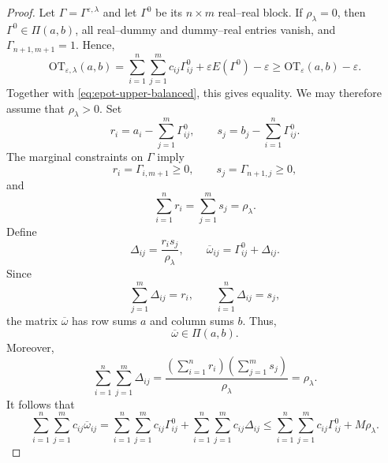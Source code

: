 \documentclass[10pt,a4paper]{amsart}
\newcommand{\OT}{\mathrm{OT}}
\newcommand{\eps}{\varepsilon}
\begin{document}
\begin{proof}
Let $\Gamma=\Gamma^{\eps,\lambda}$ and let $\Gamma^0$ be its $n\times m$ real--real block. If $\rho_{\lambda}=0$, then $\Gamma^0\in\Pi(a,b)$, all real--dummy and dummy--real entries vanish, and $\Gamma_{n+1,m+1}=1$. Hence,
\begin{equation*}
  \OT_{\eps,\lambda}(a,b) = \sum_{i = 1}^{n}\sum_{j = 1}^{m}c_{ij}\Gamma^0_{ij} + \eps E(\Gamma^0)-\eps \geq \OT_{\eps}(a,b)-\eps.
\end{equation*}
Together with \eqref{eq:epot-upper-balanced}, this gives equality. We may therefore assume that $\rho_{\lambda}>0$.
Set
\begin{equation*}
  r_i=a_i-\sum_{j=1}^{m}\Gamma^0_{ij},\qquad s_j=b_j-\sum_{i=1}^{n}\Gamma^0_{ij}.
\end{equation*}
The marginal constraints on $\Gamma$ imply
\begin{equation*}
  r_i=\Gamma_{i,m+1}\geq0,\qquad s_j=\Gamma_{n+1,j}\geq0,
\end{equation*}
and
\begin{equation*}
  \sum_{i=1}^{n}r_i=\sum_{j=1}^{m}s_j=\rho_{\lambda}.
\end{equation*}
Define
\begin{equation*}
  \Delta_{ij}=\frac{r_i s_j}{\rho_{\lambda}},\qquad \overline\omega_{ij}=\Gamma^0_{ij}+\Delta_{ij}.
\end{equation*}
Since
\begin{equation*}
  \sum_{j=1}^{m}\Delta_{ij}=r_i,\qquad \sum_{i=1}^{n}\Delta_{ij}=s_j,
\end{equation*}
the matrix $\overline\omega$ has row sums $a$ and column sums $b$. Thus,
\begin{equation*}
  \overline\omega\in\Pi(a,b).
\end{equation*}
Moreover,
\begin{equation*}
  \sum_{i = 1}^{n}\sum_{j = 1}^{m}\Delta_{ij} = \frac{\left(\sum_{i = 1}^{n}r_i\right)\left(\sum_{j = 1}^{m}s_j\right)}{\rho_{\lambda}} = \rho_{\lambda}.
\end{equation*}
It follows that
\begin{equation}\label{eq:value-cost-estimate}
  \sum_{i = 1}^{n}\sum_{j = 1}^{m}c_{ij}\overline\omega_{ij} = \sum_{i = 1}^{n}\sum_{j = 1}^{m}c_{ij}\Gamma^0_{ij} + \sum_{i = 1}^{n}\sum_{j = 1}^{m}c_{ij}\Delta_{ij} \leq \sum_{i = 1}^{n}\sum_{j = 1}^{m}c_{ij}\Gamma^0_{ij} + M\rho_{\lambda}.
\end{equation}


\end{proof}
\end{document}
